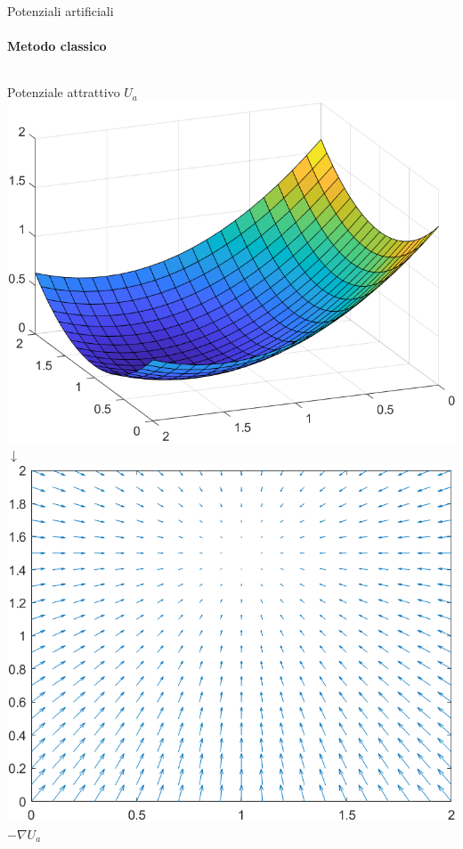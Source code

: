 \documentclass[handout]{beamer}
\begin{document}
\begin{frame}{Potenziali artificiali}
\framesubtitle{Metodo classico}
\begin{columns}

	\centering
	{\small Potenziale attrattivo $U_a$}
	\includegraphics[scale=0.28]{potA.png} \\
	$\downarrow$\\
	\includegraphics[scale=0.28]{antigradA.png} \\
	$-\nabla U_a$


\end{columns}
\end{frame}
\end{document}
